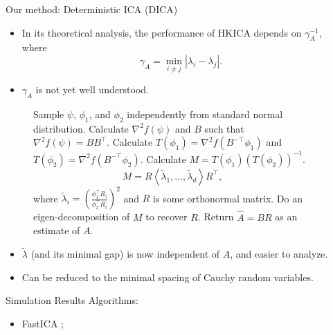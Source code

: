 \documentclass[final]{beamer} %
\begin{document}
\begin{frame}[c]
\begin{columns}[t,totalwidth=\textwidth]
	\begin{column}{0.01\textwidth}
	\end{column}
	\begin{column}{0.32\textwidth}
			
		\begin{block}{Our method: Deterministic ICA (DICA)}	
			\begin{itemize}
				\item In its theoretical analysis,  the performance of HKICA depends on $\gamma_A^{-1}$, where
					\[
					\gamma_A = \min_{i\neq j} \left\vert \lambda_i - \lambda_j\right \vert.
					\]
					\vspace{-1cm}
				\item $\gamma_A$ is not yet well understood.
			\end{itemize}	
			\begin{figure}
			\begin{algorithmic}[1]
				\STATE Sample $\psi$, $\phi_1$, and $\phi_2$ independently from standard normal distribution.
				\STATE Calculate $\nabla^2 f(\psi)$ and $B$ such that $\nabla^2 f(\psi) = BB^{\top}$.
				\STATE Calculate $T(\phi_1) = \nabla^2 f(B^{-\top}\phi_1)$ and $T(\phi_2) = \nabla^2 f(B^{-\top}\phi_2)$.
				\STATE Calculate $M = T(\phi_1)(T(\phi_2))^{-1}$.
					\[
					M = R \left\langle\tilde{\lambda}_1, \ldots, \tilde{\lambda}_d \right\rangle R^{\top},
					\]
					where $\tilde{\lambda}_i = \left(\frac{\phi_1^{\top}R_i}{\phi_2^{\top}R_i}\right)^2$ and $R$ is some orthonormal matrix.
				\STATE Do an eigen-decomposition of $M$ to recover $R$.
				\STATE Return $\hat{A} = BR$ as an estimate of $A$. 
			\end{algorithmic}
			\end{figure}
			\begin{itemize}
				\item $\tilde{\lambda}$ (and its minimal gap) is now independent of $A$, and easier to analyze.
				\item Can be reduced to the minimal spacing of Cauchy random variables.
			\end{itemize}
			\bigskip
		\end{block}
		\vspace{0.5ex}
		\bigskip
		\bigskip
		\bigskip
		\begin{block}{Simulation Results}
			\noindent Algorithms:
			\begin{itemize}
				\item FastICA  \citep{szabo12separation};

\end{itemize}
\end{block}
\end{column}
\end{columns}
\end{frame}
\end{document}
